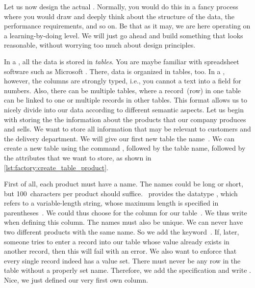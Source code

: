 %
%
%
Let us now design the actual \db.
Normally, you would do this in a fancy process where you would draw  and deeply think about the structure of the data, the performance requirements, and so on.
Be that as it may, we are here operating on a learning-by-doing level.
We will just go ahead and build something that looks reasonable, without worrying too much about design principles.

In a , all the data is stored in \emph{tables}.
You are maybe familiar with spreadsheet software such as Microsoft .
There, data is organized in tables, too.
In a , however, the columns are strongly typed, i.e., you cannot  a text into a field for numbers.
Also, there can be multiple tables, where a record~(row) in one table can be linked to one or multiple records in other tables.
This format allows us to nicely divide into our data according to different semantic aspects.%
%
%
%
Let us begin with storing the the information about the products that our company produces and sells.
We want to store all information that may be relevant to customers and the delivery department.
We will give our first new table the name~.%
%
%
%
%
%
%
We can create a new table using the command , followed by the table name, followed by the attributes that we want to store, as shown in \cref{lst:factory:create_table_product}.

First of all, each product must have a name.
The names could be long or short, but 100~characters per product should suffice.
\sql\ provides the datatype , which refers to a variable-length string, whose maximum length is specified in parentheses~\cite{PGDG:PD:CT}.
We could thus choose  for the column  for our table~.
We thus write~ when defining this column.
The names must also be unique.
We can never have two different products with the same name.
So we add the keyword~.
If, later, someone tries to enter a record into our table whose  value already exists in another record, then this will fail with an error.
We also want to enforce that every single record indeed has a  value set.
There must never be any row in the table without a properly set name.
Therefore, we add the  specification and write .
Nice, we just defined our very first own column.

